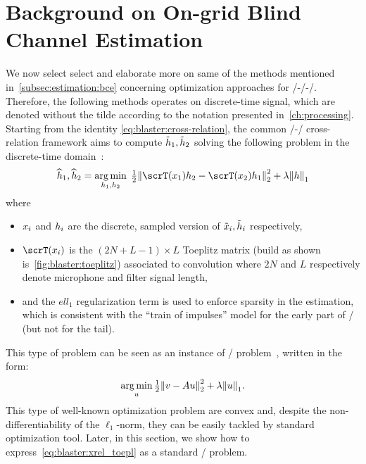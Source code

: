\section{Background on On-grid Blind Channel Estimation}\label{sec:blaster:background}
We now select select and elaborate more on same of the methods mentioned in~\cref{subsec:estimation:bce} concerning optimization approaches for \FIR/-\SIMO/-\BCE/.
Therefore, the following methods operates on discrete-time signal, which are denoted without the tilde according to the notation presented in~\cref{ch:processing}.
Starting from the identity \cref{eq:blaster:cross-relation}, the common \SIMO/-\BCE/ cross-relation framework aims to compute $\tilde{h}_1, \tilde{h}_2$ solving the following problem in the discrete-time domain~:
\begin{equation}
    \label{eq:blaster:xrel_toepl}
    \disFilterHat_1, \disFilterHat_2
    =
    \kargmin_{\disFilter_1, \disFilter_2}
    \;
    \tfrac{1}{2}
    \kvvbar{
        \scrT(\disRecordedSignal_1) \disFilter_2
        -
        \scrT(\disRecordedSignal_2) \disFilter_1
    }_2^2
    +
    \lambda
    \kvvbar{
        \disFilter
    }_1
\end{equation}
where
\begin{itemize}
    \item  $x_i$ and $h_i$ are the discrete, sampled version of $\tilde{x}_i, \tilde{h}_i$ respectively,
    \item $\scrT(\disRecordedSignal_i)$ is the $(2N+L-1) \times L$ Toeplitz matrix (build as shown is~\cref{fig:blaster:toeplitz})
    associated to convolution where $2N$ and $L$ respectively denote  microphone and filter signal length,
    \item and the $ell_1$ regularization term is used to enforce sparsity in the estimation, which is consistent with the ``train of impulses'' model for the early part of \RIRs/ (but not for the tail).
\end{itemize}
This type of problem can be seen as an instance of \LASSO/ problem~, written in the form:
\begin{equation}\label{eq:blaster:lasso}
    \kargmin_{u} \tfrac{1}{2} \kvvbar{v - Au}_2^2 + \lambda\kvvbar{u}_1
    .
\end{equation}
This type of well-known optimization problem are convex and, despite the non-differentiability of the $\ell_1$-norm, they can be easily tackled by standard optimization tool.
Later, in this section, we show how to express~\cref{eq:blaster:xrel_toepl} as a standard \LASSO/ problem.


